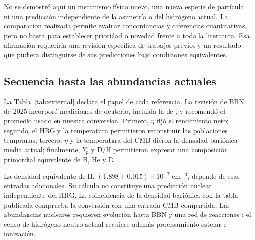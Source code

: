 No se demostró aquí un mecanismo físico nuevo, una nueva especie de partícula ni una predicción independiente de la asimetría o del hidrógeno actual. La comparación realizada permite evaluar concordancias y diferencias cuantitativas, pero no basta para establecer prioridad o novedad frente a toda la literatura. Esa afirmación requeriría una revisión específica de trabajos previos y un resultado que pudiera distinguirse de sus predicciones bajo condiciones equivalentes.

\subsection{Secuencia hasta las abundancias actuales}
La Tabla~\ref{tab:external} declara el papel de cada referencia. La revisión de BBN de 2025 incorporó mediciones de deuterio, incluida la de \citet{Cooke2018}, y recomendó el promedio usado en nuestra conversión. Primero, $\eta$ fijó el rendimiento neto; segundo, el HRG y la temperatura permitieron reconstruir las poblaciones tempranas; tercero, $\eta$ y la temperatura del CMB dieron la densidad bariónica media actual; finalmente, $Y_p$ y D/H permitieron expresar una composición primordial equivalente de H, He y D.

La densidad equivalente de H, $(1.898\pm0.015)\times10^{-7}$ cm$^{-3}$, depende de esas entradas adicionales. Su cálculo no constituye una predicción nuclear independiente del HRG. La coincidencia de la densidad bariónica con la tabla publicada comprueba la conversión con una entrada CMB compartida. Las abundancias nucleares requieren evolución hasta BBN y una red de reacciones \citep{Fields2025}; el censo de hidrógeno neutro actual requiere además procesamiento estelar e ionización.


